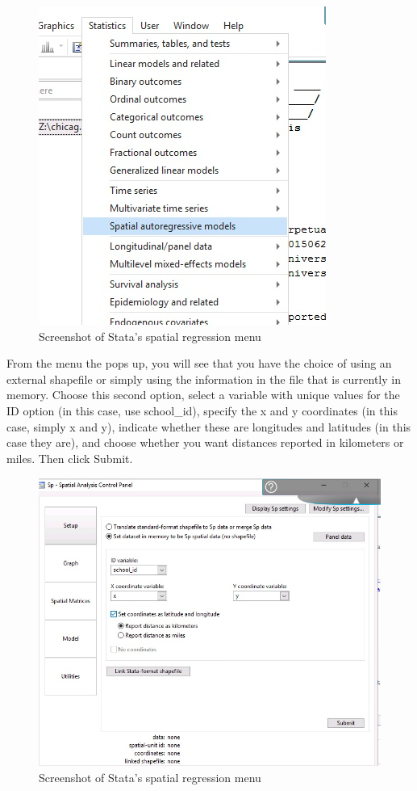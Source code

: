 \documentclass[]{book}
\begin{document}
\begin{figure}
\centering
\includegraphics{images/stata_spatial_menu.png}
\caption{Screenshot of Stata's spatial regression menu}
\end{figure}

From the menu the pops up, you will see that you have the choice of using an external shapefile or simply using the information in the file that is currently in memory. Choose this second option, select a variable with unique values for the ID option (in this case, use school\_id), specify the x and y coordinates (in this case, simply x and y), indicate whether these are longitudes and latitudes (in this case they are), and choose whether you want distances reported in kilometers or miles. Then click Submit.

\begin{figure}
\centering
\includegraphics{images/stata_spatial_menu2.png}
\caption{Screenshot of Stata's spatial regression menu}
\end{figure}
\end{document}
